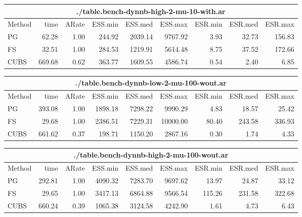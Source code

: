 \documentclass[11pt]{article}
\begin{document}
\begin{table}
\begin{tabular}{l r r r r r r r r } 
\hline
\multicolumn{9}{c}{./table.bench-dynnb-high-2-mu-10-with.ar} \\
\hline
          Method  &     time &    ARate &  ESS.min &  ESS.med &  ESS.max &  ESR.min &  ESR.med &  ESR.max \\ 
              PG  &    62.28 &     1.00 &   244.92 &  2039.14 &  9767.92 &     3.93 &    32.73 &   156.83 \\ 
              FS  &    32.51 &     1.00 &   284.53 &  1219.91 &  5614.48 &     8.75 &    37.52 &   172.66 \\ 
            CUBS  &   669.68 &     0.62 &   363.77 &  1609.55 &  4586.74 &     0.54 &     2.40 &     6.85
 \end{tabular}

\begin{tabular}{l r r r r r r r r } 
\hline
\multicolumn{9}{c}{./table.bench-dynnb-low-2-mu-100-wout.ar} \\
\hline
          Method  &     time &    ARate &  ESS.min &  ESS.med &  ESS.max &  ESR.min &  ESR.med &  ESR.max \\ 
              PG  &   393.08 &     1.00 &  1898.18 &  7298.22 &  9990.29 &     4.83 &    18.57 &    25.42 \\ 
              FS  &    29.68 &     1.00 &  2386.51 &  7229.31 & 10000.00 &    80.40 &   243.58 &   336.93 \\ 
            CUBS  &   661.62 &     0.37 &   198.71 &  1150.20 &  2867.16 &     0.30 &     1.74 &     4.33
 \end{tabular}

\begin{tabular}{l r r r r r r r r } 
\hline
\multicolumn{9}{c}{./table.bench-dynnb-high-2-mu-100-wout.ar} \\
\hline
          Method  &     time &    ARate &  ESS.min &  ESS.med &  ESS.max &  ESR.min &  ESR.med &  ESR.max \\ 
              PG  &   292.81 &     1.00 &  4090.32 &  7283.70 &  9697.62 &    13.97 &    24.87 &    33.12 \\ 
              FS  &    29.65 &     1.00 &  3417.13 &  6864.88 &  9566.54 &   115.26 &   231.58 &   322.68 \\ 
            CUBS  &   660.24 &     0.39 &  1065.38 &  3124.58 &  4242.90 &     1.61 &     4.73 &     6.43
 \end{tabular}


\end{table}
\end{document}
